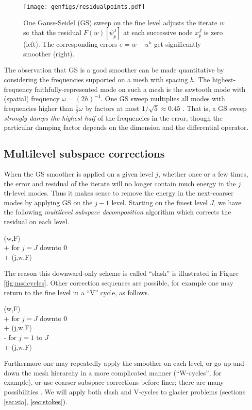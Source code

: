 \documentclass[letterpaper,final,12pt,reqno]{amsart}
\theoremstyle{claim}
\numberwithin{equation}{section}
\numberwithin{figure}{section}
\numberwithin{table}{section}
\numberwithin{theorem}{section}
\begin{document}
\begin{figure}[t]
\texttt{[image: genfigs/residualpoints.pdf]}
\caption{One Gauss-Seidel (GS) sweep on the fine level adjusts the iterate $w$ so that the residual $F(w)[\psi_p^J]$ at each successive node $x_p^J$ is zero (left).  The corresponding errors $e=w-u^h$ get significantly smoother (right).}
\label{fig:residualpoints}
\end{figure}

The observation that GS is a good smoother can be made quantitative by considering the frequencies supported on a mesh with spacing $h$.  The highest-frequency faithfully-represented mode on such a mesh is the sawtooth mode with (spatial) frequency $\omega=(2h)^{-1}$.  One GS sweep multiplies all modes with frequencies higher than $\frac{1}{2} \omega$ by factors at most $1/\sqrt{5}\approx 0.45$ \cite[Chapter 4]{Briggsetal2000}.  That is, a GS sweep \emph{strongly damps the highest half} of the frequencies in the error, though the particular damping factor depends on the dimension and the differential operator.

\subsection*{Multilevel subspace corrections}  When the GS smoother is applied on a given level $j$, whether once or a few times, the error and residual of the iterate will no longer contain much energy in the $j$th-level modes.  Thus it makes sense to remove the energy in the next-coarser modes by applying GS on the $j-1$ level.  Starting on the finest level $J$, we have the following \emph{multilevel subspace decomposition} algorithm which corrects the residual on each level.
\begin{pseudo*}
(w,F)\text{:} \\+
    for $j=J$ downto $0$ \\+
        (j,w,F)
\end{pseudo*}

The reason this downward-only scheme is called ``slash'' is illustrated in Figure \ref{fig:msdcycles}.  Other correction sequences are possible, for example one may return to the fine level in a ``V'' cycle, as follows.
\begin{pseudo*}
(w,F)\text{:} \\+
    for $j=J$ downto $0$ \\+
        (j,w,F) \\-
    for $j=1$ to $J$ \\+
        (j,w,F)
\end{pseudo*}
Furthermore one may repeatedly apply the smoother on each level, or go up-and-down the mesh hierarchy in a more complicated manner (``W-cycles'', for example), or use coarser subspace corrections before finer; there are many possibilities \cite{Briggsetal2000,Trottenbergetal2001}.  We will apply both slash and V-cycles to glacier problems (sections \ref{sec:sia}, \ref{sec:stokes}).
\end{document}
